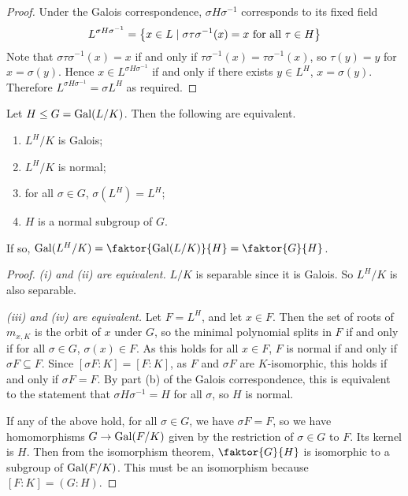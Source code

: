\begin{proof}
	Under the Galois correspondence, \( \sigma H \sigma^{-1} \) corresponds to its fixed field
	\[ L^{\sigma H \sigma^{-1}} = \qty{x \in L \mid \sigma \tau \sigma^{-1}(x) = x \text{ for all } \tau \in H} \]
	Note that \( \sigma \tau \sigma^{-1}(x) = x \) if and only if \( \tau \sigma^{-1}(x) = \tau \sigma^{-1}(x) \), so \( \tau(y) = y \) for \( x = \sigma(y) \).
	Hence \( x \in L^{\sigma H \sigma^{-1}} \) if and only if there exists \( y \in L^H \), \( x = \sigma(y) \).
	Therefore \( L^{\sigma H \sigma^{-1}} = \sigma L^H \) as required.
\end{proof}
\begin{theorem}
	Let \( H \leq G = \operatorname{Gal}(L/K) \).
	Then the following are equivalent.
	\begin{enumerate}
		\item \( L^H / K \) is Galois;
		\item \( L^H / K \) is normal;
		\item for all \( \sigma \in G \), \( \sigma(L^H) = L^H \);
		\item \( H \) is a normal subgroup of \( G \).
	\end{enumerate}
	If so, \( \Gal(L^H / K) = \faktor{\Gal(L / K)}{H} = \faktor{G}{H} \).
\end{theorem}
\begin{proof}
	\emph{(i) and (ii) are equivalent.}
	\( L / K \) is separable since it is Galois.
	So \( L^H / K \) is also separable.

	\emph{(iii) and (iv) are equivalent.}
	Let \( F = L^H \), and let \( x \in F \).
	Then the set of roots of \( m_{x,K} \) is the orbit of \( x \) under \( G \), so the minimal polynomial splits in \( F \) if and only if for all \( \sigma \in G \), \( \sigma(x) \in F \).
	As this holds for all \( x \in F \), \( F \) is normal if and only if \( \sigma F \subseteq F \).
	Since \( [\sigma F : K] = [F : K] \), as \( F \) and \( \sigma F \) are \( K \)-isomorphic, this holds if and only if \( \sigma F = F \).
	By part (b) of the Galois correspondence, this is equivalent to the statement that \( \sigma H \sigma^{-1} = H \) for all \( \sigma \), so \( H \) is normal.

	If any of the above hold, for all \( \sigma \in G \), we have \( \sigma F = F \), so we have homomorphisms \( G \to \operatorname{Gal}(F/K) \) given by the restriction of \( \sigma \in G \) to \( F \).
	Its kernel is \( H \).
	Then from the isomorphism theorem, \( \faktor{G}{H} \) is isomorphic to a subgroup of \( \operatorname{Gal}(F/K) \).
	This must be an isomorphism because \( [F : K] = (G : H) \).
\end{proof}

